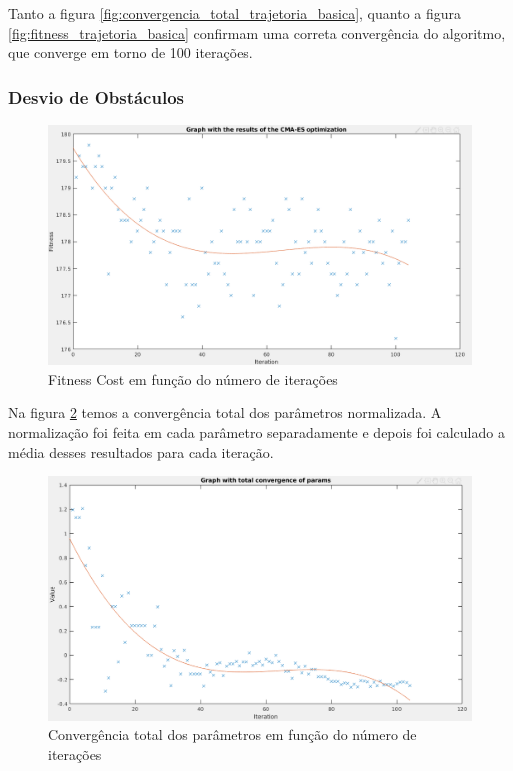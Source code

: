 \documentclass[a4paper,12pt]{article}
\begin{document}
Tanto a figura \ref{fig:convergencia_total_trajetoria_basica}, quanto a figura \ref{fig:fitness_trajetoria_basica} confirmam uma correta convergência do algoritmo, que converge em torno de 100 iterações.

\subsubsection{Desvio de Obstáculos}

\begin{figure}[H]
	\centering
	\includegraphics[width=1.0\textwidth]{figures/CMA-ES_Fitness_Results_ally.png}
	\caption{Fitness Cost em função do número de iterações}
	\label{fig:fitness_trajetoria_basica_ally}
\end{figure}

Na figura \ref{fig:convergencia_total_trajetoria_basica_ally} temos a convergência total dos parâmetros normalizada. A normalização foi feita em cada parâmetro separadamente e depois foi calculado a média desses resultados para cada iteração.

\begin{figure}[H]
	\centering
	\includegraphics[width=1.0\textwidth]{figures/CMA-ES_Total_parameter_convergence_ally.png}
	\caption{Convergência total dos parâmetros em função do número de iterações}
	\label{fig:convergencia_total_trajetoria_basica_ally}
\end{figure}
\end{document}
